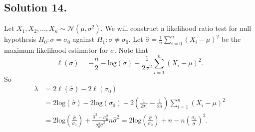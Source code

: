 \subsection*{Solution 14.}

Let $X_1, X_2, ..., X_n \sim \mathcal{N}(\mu, \sigma^2)$.
We will construct a likelihood ratio test for null hypothesis $H_0: \sigma = \sigma_0$ against $H_1: \sigma \neq \sigma_0$.
Let $\hat{\sigma} = \frac{1}{n}\sum_{i=0}^n (X_i - \mu)^2$ be the maximum likelihood estimator for $\sigma$.
Note that
$$
\ell(\sigma) = -\frac{n}{2} - \mathrm{log}(\sigma) - \frac{1}{2\sigma^2} \sum_{i=1}^n (X_i - \mu)^2.
$$
So
\begin{equation*}
\begin{split}
\lambda &= 2\ell(\hat{\sigma}) - 2\ell(\sigma_0) \\
    &= 2\mathrm{log}(\hat{\sigma}) - 2\mathrm{log}(\sigma_0) + 2\left(\frac{1}{2\sigma_0} - \frac{1}{2\hat{\sigma}}\right) \sum_{i=1}^n (X_i - \mu)^2 \\
    &= 2\mathrm{log}\left(\frac{\hat{\sigma}}{\sigma_0}\right) + \frac{\hat{\sigma}^2 - \sigma_0^2}{\sigma_0^2 \hat{\sigma}^2} n \hat{\sigma}^2
    = 2\mathrm{log}\left(\frac{\hat{\sigma}}{\sigma_0}\right) + n - n\left(\frac{\sigma_0}{\hat{\sigma}}\right)^2.
\end{split}
\end{equation*}
